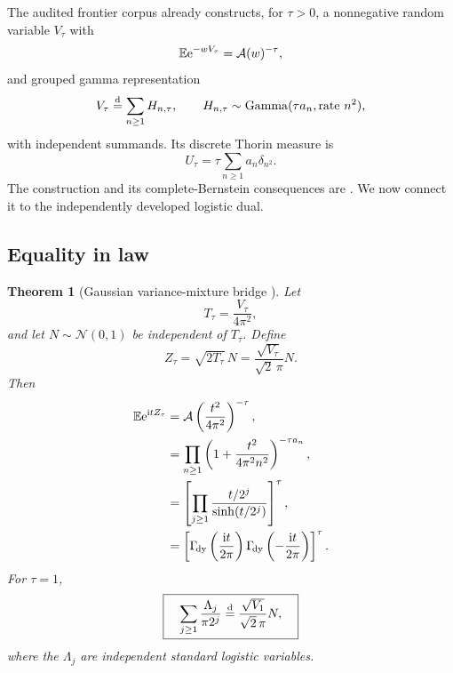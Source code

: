 \documentclass[11pt]{article}
\newtheorem{theorem}{Theorem}[section]
\theoremstyle{definition}
\theoremstyle{remark}
\newcommand{\E}{\mathbb E}
\begin{document}
The audited frontier corpus already constructs, for $\tau>0$, a nonnegative random variable
$V_\tau$ with
\begin{equation}
 \E\e^{-wV_\tau}=\Acal(w)^{-\tau},                        \label{p2:eq:V-LT}
\end{equation}
and grouped gamma representation
\begin{equation}
 V_\tau\mathrel{\stackrel{\mathrm d}=}\sum_{n\ge1}H_{n,\tau},
 \qquad
 H_{n,\tau}\sim\operatorname{Gamma}(\tau a_n,
                 \text{rate }n^2),                       \label{p2:eq:V-gamma}
\end{equation}
with independent summands.  Its discrete Thorin measure is
\begin{equation}
 U_\tau=\tau\sum_{n\ge1}a_n\delta_{n^2}.                 \label{p2:eq:Thorin}
\end{equation}
The construction and its complete-Bernstein consequences are \Repo.  We now connect it to
the independently developed logistic dual.

\subsection{Equality in law}

\begin{theorem}[Gaussian variance-mixture bridge \New]
Let
\begin{equation}
 T_\tau=\frac{V_\tau}{4\pi^2},                            \label{p2:eq:Ttau}
\end{equation}
and let $N\sim\mathcal N(0,1)$ be independent of $T_\tau$.  Define
\begin{equation}
 Z_\tau=\sqrt{2T_\tau}\,N
 =\frac{\sqrt{V_\tau}}{\sqrt2\,\pi}N.                   \label{p2:eq:Ztau-mixture}
\end{equation}
Then
\begin{align}
 \E\e^{\ii tZ_\tau}
 &=\Acal\left(\frac{t^2}{4\pi^2}\right)^{-\tau},        \label{p2:eq:Ztau-cf-A}\\
 &=\prod_{n\ge1}\left(1+\frac{t^2}{4\pi^2n^2}\right)^{-\tau a_n},
                                                               \label{p2:eq:Ztau-cf-canonical}\\
 &=\left[\prod_{j\ge1}\frac{t/2^j}{\sinh(t/2^j)}\right]^\tau,
                                                               \label{p2:eq:Ztau-cf-logistic}\\
 &=\left[\GammaDy\left(\frac{\ii t}{2\pi}\right)
          \GammaDy\left(-\frac{\ii t}{2\pi}\right)\right]^\tau.
                                                               \label{p2:eq:Ztau-cf-gamma}
\end{align}
For $\tau=1$,
\begin{equation}
 \boxed{\quad
 \sum_{j\ge1}\frac{\Lambda_j}{\pi2^j}
 \mathrel{\stackrel{\mathrm d}=}
 \frac{\sqrt{V_1}}{\sqrt2\,\pi}N,
 \quad}                                                  \label{p2:eq:logistic-mixture-law}
\end{equation}
where the $\Lambda_j$ are independent standard logistic variables.
\end{theorem}
\end{document}
